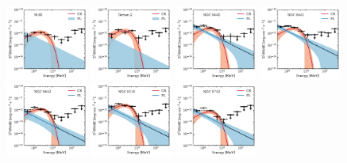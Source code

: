 \documentclass[doublespace,draft,nopageskip]{VTthesis} %
\begin{document}
\begin{appendices}
\begin{figure}
\centering
\includegraphics[width=0.24\textwidth]{Figures/Globular/spectra/2comp_8.pdf}
\includegraphics[width=0.24\textwidth]{Figures/Globular/spectra/2comp_28.pdf}
\includegraphics[width=0.24\textwidth]{Figures/Globular/spectra/2comp_18.pdf}
\includegraphics[width=0.24\textwidth]{Figures/Globular/spectra/2comp_19.pdf}
\includegraphics[width=0.24\textwidth]{Figures/Globular/spectra/2comp_22.pdf}
\includegraphics[width=0.24\textwidth]{Figures/Globular/spectra/2comp_13.pdf}
\includegraphics[width=0.24\textwidth]{Figures/Globular/spectra/2comp_24.pdf}

\end{figure}
\end{appendices}
\end{document}
